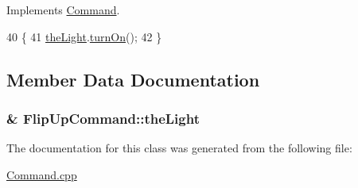 Implements \hyperlink{classCommand_a6fd7d9bd8df8bfc881e4d6c7cd1878b7}{Command}.


\begin{DoxyCode}
40     \{
41         \hyperlink{classFlipUpCommand_a0fbc80da677f2a8b95952585ff20b473}{theLight}.\hyperlink{classLight_a79613afb0cf7788c131091afccb46aef}{turnOn}();
42     \}
\end{DoxyCode}


\subsection{Member Data Documentation}
\subsubsection[{\texorpdfstring{the\+Light}{theLight}}]{\& Flip\+Up\+Command\+::the\+Light\hspace{0.3cm}{\ttfamily [private]}}\hypertarget{classFlipUpCommand_a0fbc80da677f2a8b95952585ff20b473}{}\label{classFlipUpCommand_a0fbc80da677f2a8b95952585ff20b473}


The documentation for this class was generated from the following file\+:\begin{DoxyCompactItemize}
\item 
\hyperlink{Command_8cpp}{Command.\+cpp}\end{DoxyCompactItemize}
